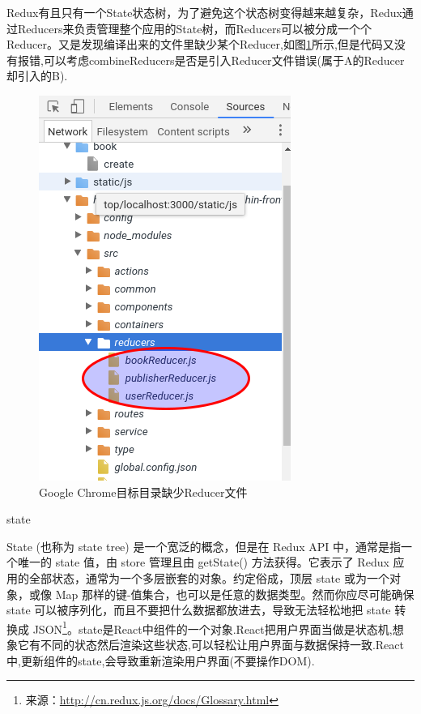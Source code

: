 \documentclass[12pt]{book}
\makeatletter
\numberwithin{dummy}{section}
\theoremstyle{ocrenumbox}
\theoremstyle{blacknumex}
\theoremstyle{blacknumbox}
\theoremstyle{ocrenum}
\renewcommand{\subsection}{\@startsection {subsection}{2}{\z@}
	{-3ex \@plus -0.1ex \@minus -.4ex}
	{0.5ex \@plus.2ex }
	{\normalfont\sffamily\bfseries}}
\makeatother
\begin{document}
Redux有且只有一个State状态树，为了避免这个状态树变得越来越复杂，Redux通过Reducers来负责管理整个应用的State树，而Reducers可以被分成一个个Reducer。又是发现编译出来的文件里缺少某个Reducer,如图\ref{fig:distdirectoryreducer}所示,但是代码又没有报错,可以考虑combineReducers是否是引入Reducer文件错误(属于A的Reducer却引入的B).

\begin{figure}[htbp]
	\centering
	\includegraphics[scale=0.5]{distdirectoryreducer.png}
	\caption{Google Chrome目标目录缺少Reducer文件}
	\label{fig:distdirectoryreducer}
\end{figure}


\subsection{state}

State (也称为 state tree) 是一个宽泛的概念，但是在 Redux API 中，通常是指一个唯一的 state 值，由 store 管理且由 getState() 方法获得。它表示了 Redux 应用的全部状态，通常为一个多层嵌套的对象。约定俗成，顶层 state 或为一个对象，或像 Map 那样的键-值集合，也可以是任意的数据类型。然而你应尽可能确保 state 可以被序列化，而且不要把什么数据都放进去，导致无法轻松地把 state 转换成 JSON\footnote{来源：\url{http://cn.redux.js.org/docs/Glossary.html}}。state是React中组件的一个对象.React把用户界面当做是状态机,想象它有不同的状态然后渲染这些状态,可以轻松让用户界面与数据保持一致.React中,更新组件的state,会导致重新渲染用户界面(不要操作DOM).
\end{document}
